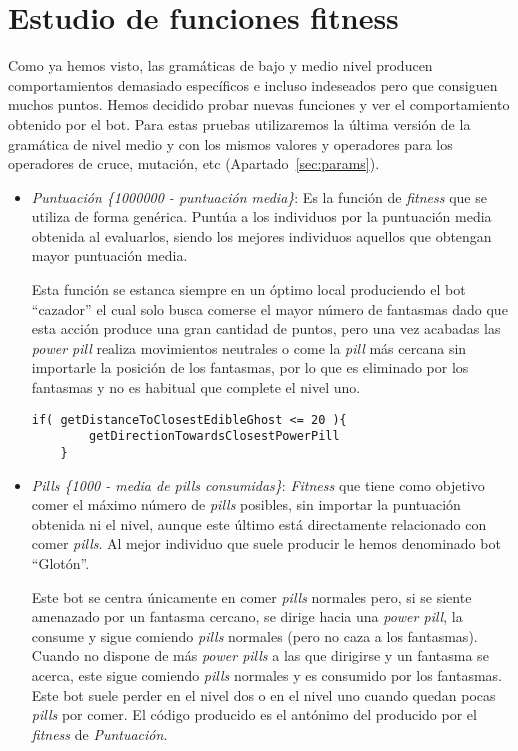 \section{Estudio de funciones fitness}
Como ya hemos visto, las gramáticas de bajo y medio nivel producen comportamientos demasiado específicos e incluso indeseados pero que consiguen muchos puntos. Hemos decidido probar nuevas funciones y ver el comportamiento obtenido por el bot. Para estas pruebas utilizaremos la última versión de la  gramática de nivel medio y con los mismos valores y operadores para los operadores de cruce, mutación, etc (Apartado~\ref{sec:params}).
\begin{itemize}
\item \textit{Puntuación \{1000000 - puntuación media\}}: Es la función de \textit{fitness} que se utiliza de forma genérica. Puntúa a los individuos por la puntuación media obtenida al evaluarlos, siendo los mejores individuos aquellos que obtengan mayor puntuación media.

Esta función se estanca siempre en un óptimo local produciendo el bot ``cazador'' el cual solo busca comerse el mayor número de fantasmas dado que esta acción produce una gran cantidad de puntos, pero una vez acabadas las \textit{power pill} realiza movimientos neutrales o come la \textit{pill} más cercana sin importarle la posición de los fantasmas, por lo que es eliminado por los fantasmas y no es habitual que complete el nivel uno.

\begin{lstlisting}[frame=single, breaklines=no, basicstyle=\fontsize{10}{11}\ttfamily, caption=Mejor individuo obtenido mediante esta función fitness.]
    if( getDistanceToClosestEdibleGhost <= 20 ){ 
        getDirectionTowardsClosestPowerPill
    }
\end{lstlisting}

\item \textit{Pills \{1000 - media de pills consumidas\}}: \textit{Fitness} que tiene como objetivo comer el máximo número de \textit{pills} posibles, sin importar la puntuación obtenida ni el nivel, aunque este último está directamente relacionado con comer \textit{pills}. Al mejor individuo que suele producir le hemos denominado bot ``Glotón''.

Este bot se centra únicamente en comer \textit{pills} normales pero, si se siente amenazado por un fantasma cercano, se dirige hacia una \textit{power pill}, la consume y sigue comiendo \textit{pills} normales (pero no caza a los fantasmas). Cuando no dispone de más \textit{power pills} a las que dirigirse y un fantasma se acerca, este sigue comiendo \textit{pills} normales y es consumido por los fantasmas. Este bot suele perder en el nivel dos o en el nivel uno cuando quedan pocas \textit{pills} por comer. El código producido es el antónimo del producido por el \textit{fitness} de \textit{Puntuación}.


\end{itemize}
